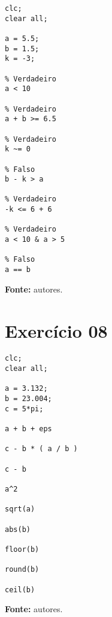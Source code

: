 \documentclass{article}
\newcommand{\leg}[1]{
    \begin{center}
    \textbf{Fonte: } #1.
    \end{center}
    \vspace{0.5cm}
}
\begin{document}
\begin{verbatim}
clc;
clear all;

a = 5.5;
b = 1.5;
k = -3;

% Verdadeiro
a < 10

% Verdadeiro
a + b >= 6.5

% Verdadeiro
k ~= 0

% Falso
b - k > a

% Verdadeiro
-k <= 6 + 6

% Verdadeiro
a < 10 & a > 5

% Falso
a == b
\end{verbatim}
\leg{autores}
\section*{Exercício 08}
\vspace{0.2cm}

\begin{verbatim}
clc;
clear all;

a = 3.132;
b = 23.004;
c = 5*pi;

a + b + eps

c - b * ( a / b )

c - b

a^2

sqrt(a)

abs(b)

floor(b)

round(b)

ceil(b)
\end{verbatim}
\leg{autores}
\end{document}

